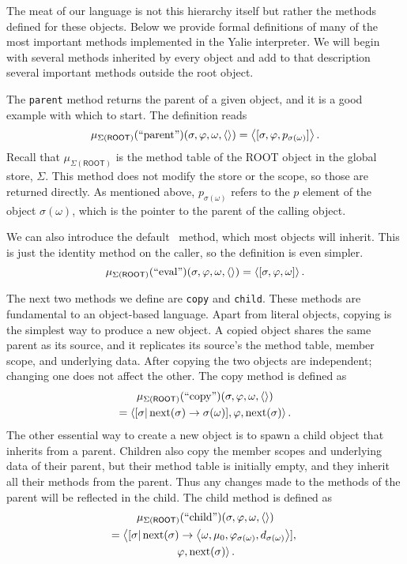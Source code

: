 \documentclass[twocolumn]{article}
\begin{document}
The meat of our language is not this hierarchy itself but rather the
methods defined for these objects. Below we provide formal definitions
of many of the most important methods implemented in the Yalie
interpreter. We will begin with several methods inherited by every
object and add to that description several important methods outside
the root object.

The \texttt{parent} method returns the parent of a given object, and
it is a good example with which to start. The definition reads
\[ \mu_{\Sigma(\mathsf{ROOT})}(\text{``parent''})(\sigma,\varphi,\omega,
\left<\right>) = \left< [\sigma,\varphi,p_{\sigma(\omega)}] \right>. \] Recall that
$\mu_{\Sigma(\mathsf{ROOT})}$ is the method table of the \textsf{ROOT}
object in the global store, $\Sigma$. This method does not modify the
store or the scope, so those are returned directly. As mentioned
above, $p_{\sigma(\omega)}$ refers to the $p$ element of the object
$\sigma(\omega)$, which is the pointer to the parent of the calling
object.

We can also introduce the default \eval\ method, which most objects
will inherit. This is just the identity method on the caller, so the
definition is even simpler.
\[ \mu_{\Sigma(\mathsf{ROOT})}(\text{``eval''})(\sigma,\varphi,\omega,
\left<\right>) = \left< [\sigma,\varphi,\omega] \right>. \]

The next two methods we define are \texttt{copy} and
\texttt{child}. These methods are fundamental to an object-based
language. Apart from literal objects, copying is the simplest way to
produce a new object. A copied object shares the same parent as its
source, and it replicates its source's the method table, member scope,
and underlying data. After copying the two objects are independent;
changing one does not affect the other. The copy method is defined as
\begin{multline*}
  \mu_{\Sigma(\mathsf{ROOT})}(\text{``copy''})(\sigma,\varphi,\omega,
\left<\right>) \\ = \left< [\sigma|\operatorname{next}(\sigma)\rightarrow\sigma(\omega)],\varphi,
\operatorname{next}(\sigma)\right>.
\end{multline*}
The other essential way to create a new object is to spawn a child
object that inherits from a parent. Children also copy the member
scopes and underlying data of their parent, but their method table is
initially empty, and they inherit all their methods from the
parent. Thus any changes made to the methods of the parent will be
reflected in the child. The child method is defined as
\begin{multline*}
  \mu_{\Sigma(\mathsf{ROOT})}(\text{``child''})(\sigma,\varphi,\omega,
  \left<\right>) \\ = \left< [\sigma|\operatorname{next}(\sigma)\rightarrow \left< \omega, \mu_0,
  \varphi_{\sigma(\omega)}, d_{\sigma(\omega)}\right>],\right.\\\left.\varphi,
  \operatorname{next}(\sigma)\right>.
\end{multline*}
\end{document}
